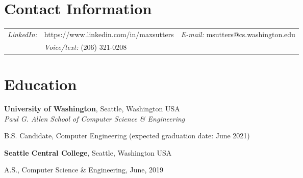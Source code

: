 \documentclass[margin,line]{res}
\newenvironment{list1}{
  \begin{list}{\ding{113}}{%
      \setlength{\itemsep}{0in}
      \setlength{\parsep}{0in} \setlength{\parskip}{0in}
      \setlength{\topsep}{0in} \setlength{\partopsep}{0in} 
      \setlength{\leftmargin}{0.17in}}}{\end{list}}
\begin{document}

\begin{resume}
\section{\sc Contact Information}
\vspace{.05in}
\begin{tabular}{@{}p{0.5in}p{2.5in}p{3in}}
{\it LinkedIn:} & https://www.linkedin.com/in/maxsutters      
							& {\it E-mail:}  msutters@cs.washington.edu \\   
							& {\it Voice/text:}  (206) 321-0208         \\   
\end{tabular}


\section{\sc Education}
{\bf University of Washington}, Seattle, Washington USA\\
{\em Paul G. Allen School of Computer Science \& Engineering} 
\vspace*{.1cm} 
\begin{list1}
\item[] B.S. Candidate, Computer Engineering (expected
  graduation date: June 2021)
\end{list1}

{\bf Seattle Central College}, Seattle, Washington USA %
\\

\vspace*{-.3cm}
\begin{list1}
\item[] A.S., Computer Science \& Engineering, June, 2019
\end{list1}

\vspace{-.2cm}

\end{resume}
\end{document}

